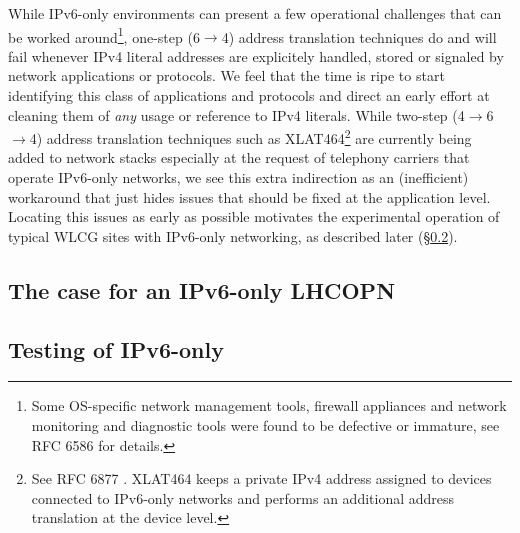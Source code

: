 While IPv6-only environments can present a few operational challenges that
can be worked around\footnote{Some OS-specific network management tools,
firewall appliances and network monitoring and diagnostic tools were found
to be defective or immature, see RFC 6586 \cite{rfc} for details.},
one-step (6$\rightarrow$4) address translation techniques do and will fail whenever 
IPv4 literal addresses are explicitely handled, stored or signaled by
network applications or protocols. We feel that the time is ripe to
start identifying this class of applications and protocols and direct an early effort
at cleaning them of {\it any} usage or reference to IPv4 literals. While 
two-step (4$\rightarrow$6$\rightarrow$4) address translation techniques
such as XLAT464\footnote{See RFC 6877 \cite{rfc}. XLAT464 keeps a private
IPv4 address assigned to devices connected to IPv6-only networks and
performs an additional address translation at the device level.}
are currently being added to 
network stacks especially at the request of telephony carriers that operate
IPv6-only networks, we see this extra indirection as an (inefficient)
workaround that just hides issues that should be fixed at the application
level. Locating this issues as early as possible motivates the experimental
operation of typical
WLCG sites with IPv6-only networking, as described
later (\S \ref{ssec:ipv6onlytest}).

\subsection{The case for an IPv6-only LHCOPN}


\subsection{Testing of IPv6-only}
\label{ssec:ipv6onlytest}



